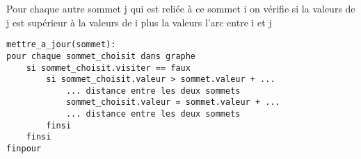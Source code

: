 				Pour chaque autre sommet j qui est reliée à ce sommet i on vérifie si
				la valeurs de j est supérieur à la valeurs de i plus la valeurs l'arc entre i et j

			\begin{lstlisting}
mettre_a_jour(sommet):
pour chaque sommet_choisit dans graphe
    si sommet_choisit.visiter == faux
        si sommet_choisit.valeur > sommet.valeur + ...
            ... distance entre les deux sommets
		    sommet_choisit.valeur = sommet.valeur + ...
            ... distance entre les deux sommets
        finsi
	finsi
finpour
			\end{lstlisting}

